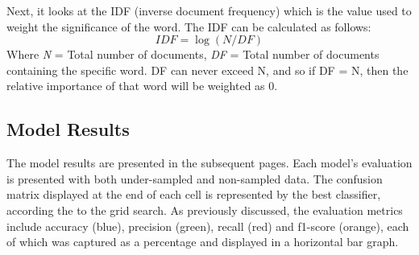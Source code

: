 \documentclass[12pt]{article}
\begin{document}
Next, it looks at the IDF (inverse document frequency) which is the value used to weight the significance of the word.  The IDF can be calculated as follows:
\[ IDF = \log(N/DF) \]
Where \textit{N} = Total number of documents, \textit{DF} = Total number of documents containing the specific word. DF can never exceed N, and so if DF = N, then the relative importance of that word will be weighted as 0.

\newpage
\subsection{Model Results}
The model results are presented in the subsequent pages. Each model’s evaluation is presented with both under-sampled and non-sampled data. The confusion matrix displayed at the end of each cell is represented by the best classifier, according the to the grid search.  As previously discussed, the evaluation metrics include accuracy (blue), precision (green), recall (red) and f1-score (orange), each of which was captured as a percentage and displayed in a horizontal bar graph.   
\end{document}
